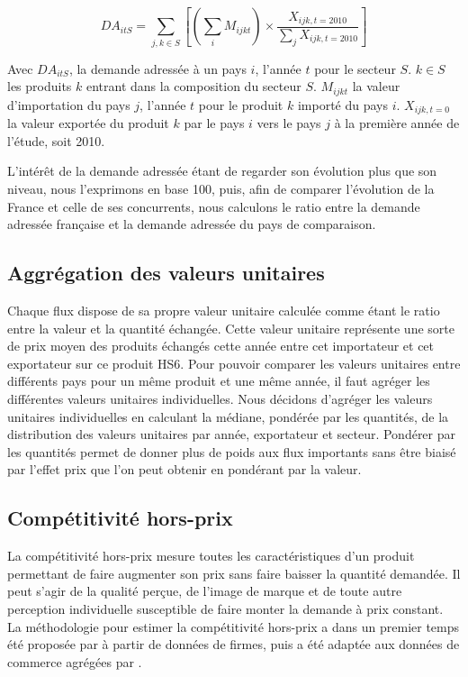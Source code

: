 \documentclass[french,10pt,a4paper]{article}
\begin{document}
\begin{equation}
\label{eq:1}
DA_{itS} = \sum_{j,k \in S} \left[ \left( \sum_{i} M_{ijkt} \right) \times \frac{X_{ijk,t=2010}}{\sum_{j}X_{ijk,t=2010}}\right]  
\end{equation}

Avec $DA_{itS}$, la demande adressée à un pays $i$, l'année $t$ pour le secteur $S$. $k \in S$ les produits $k$ entrant dans la composition du secteur $S$. $M_{ijkt}$ la valeur d'importation du pays $j$, l'année $t$ pour le produit $k$ importé du pays $i$. $X_{ijk, t=0}$ la valeur exportée du produit $k$ par le pays $i$ vers le pays $j$ à la première année de l'étude, soit 2010.

L'intérêt de la demande adressée étant de regarder son évolution plus que son niveau, nous l'exprimons en base 100, puis, afin de comparer l'évolution de la France et celle de ses concurrents, nous calculons le ratio entre la demande adressée française et la demande adressée du pays de comparaison. 

\subsection*{Aggrégation des valeurs unitaires}

Chaque flux dispose de sa propre valeur unitaire calculée comme étant le ratio entre la valeur et la quantité échangée. Cette valeur unitaire représente une sorte de prix moyen des produits échangés cette année entre cet importateur et cet exportateur sur ce produit HS6. Pour pouvoir comparer les valeurs unitaires entre différents pays pour un même produit et une même année, il faut agréger les différentes valeurs unitaires individuelles. Nous décidons d'agréger les valeurs unitaires individuelles en calculant la médiane, pondérée par les quantités, de la distribution des valeurs unitaires par année, exportateur et secteur. Pondérer par les quantités permet de donner plus de poids aux flux importants sans être biaisé par l'effet prix que l'on peut obtenir en pondérant par la valeur.

\subsection*{Compétitivité hors-prix}

La compétitivité hors-prix mesure toutes les caractéristiques d'un produit permettant de faire augmenter son prix sans faire baisser la quantité demandée. Il peut s'agir de la qualité perçue, de l'image de marque et de toute autre perception individuelle susceptible de faire monter la demande à prix constant. La méthodologie pour estimer la compétitivité hors-prix a dans un premier temps été proposée par \cite{Khandelwal2013} à partir de données de firmes, puis a été adaptée aux données de commerce agrégées par \cite{Bas2015}.
\end{document}
